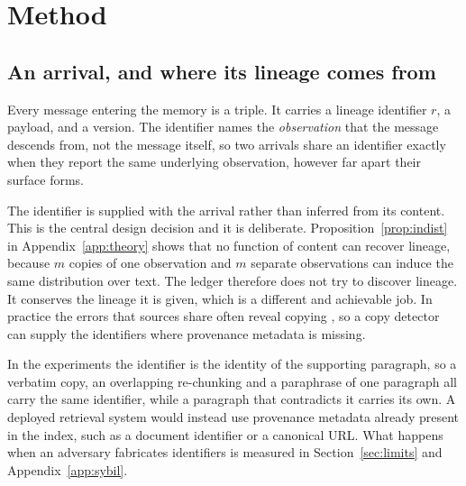 \documentclass{article}
\begin{document}
\section{Method}
\label{sec:method}

\subsection{An arrival, and where its lineage comes from}
\label{sec:arrival}
Every message entering the memory is a triple. It carries a lineage identifier
$r$, a payload, and a version. The identifier names the \emph{observation} that
the message descends from, not the message itself, so two arrivals share an
identifier exactly when they report the same underlying observation, however far
apart their surface forms.

The identifier is supplied with the arrival rather than inferred from its
content. This is the central design decision and it is deliberate.
Proposition~\ref{prop:indist} in Appendix~\ref{app:theory} shows that no function
of content can recover lineage, because $m$ copies of one observation and $m$
separate observations can induce the same distribution over text. The ledger
therefore does not try to discover lineage. It conserves the lineage it is
given, which is a different and achievable job. In practice the errors that
sources share often reveal copying \citep{dong2009dependence}, so a copy detector
can supply the identifiers where provenance metadata is missing.

In the experiments the identifier is the identity of the supporting paragraph,
so a verbatim copy, an overlapping re-chunking and a paraphrase of one paragraph
all carry the same identifier, while a paragraph that contradicts it carries its
own. A deployed retrieval system would instead use provenance metadata already
present in the index, such as a document identifier or a canonical URL. What
happens when an adversary fabricates identifiers is measured in
Section~\ref{sec:limits} and Appendix~\ref{app:sybil}.
\end{document}
